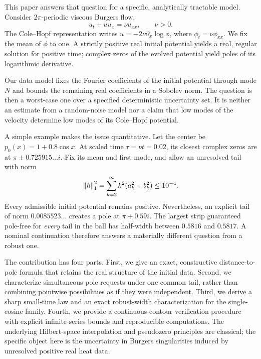 \documentclass[11pt]{article}
\begin{document}
This paper answers that question for a specific, analytically tractable model. Consider $2\pi$-periodic viscous Burgers flow,
\begin{equation}\label{eq:burgers}
 u_t+uu_x=\nu u_{xx},\qquad \nu>0.
\end{equation}
The Cole--Hopf representation writes $u=-2\nu\partial_x\log\phi$, where $\phi_t=\nu\phi_{xx}$. We fix the mean of $\phi$ to one. A strictly positive real initial potential yields a real, regular solution for positive time; complex zeros of the evolved potential yield poles of its logarithmic derivative.

Our data model fixes the Fourier coefficients of the initial potential through mode $N$ and bounds the remaining real coefficients in a Sobolev norm. The question is then a worst-case one over a specified deterministic uncertainty set. It is neither an estimate from a random-noise model nor a claim that low modes of the velocity determine low modes of its Cole--Hopf potential.

A simple example makes the issue quantitative. Let the center be $p_0(x)=1+0.8\cos x$. At scaled time $\tau=\nu t=0.02$, its closest complex zeros are at $\pi\pm0.725915\ldots i$. Fix its mean and first mode, and allow an unresolved tail with norm
\[
 \left\lVert h\right\rVert_1^2=\sum_{k=2}^{\infty}k^2(a_k^2+b_k^2)\le 10^{-4}.
\]
Every admissible initial potential remains positive. Nevertheless, an explicit tail of norm $0.0085523\ldots$ creates a pole at $\pi+0.59i$. The largest strip guaranteed pole-free for \emph{every} tail in the ball has half-width between $0.5816$ and $0.5817$. A nominal continuation therefore answers a materially different question from a robust one.

The contribution has four parts. First, we give an exact, constructive distance-to-pole formula that retains the real structure of the initial data. Second, we characterize simultaneous pole requests under one common tail, rather than combining pointwise possibilities as if they were independent. Third, we derive a sharp small-time law and an exact robust-width characterization for the single-cosine family. Fourth, we provide a continuous-contour verification procedure with explicit infinite-series bounds and reproducible computations. The underlying Hilbert-space interpolation and pseudozero principles are classical; the specific object here is the uncertainty in Burgers singularities induced by unresolved positive real heat data.
\end{document}
